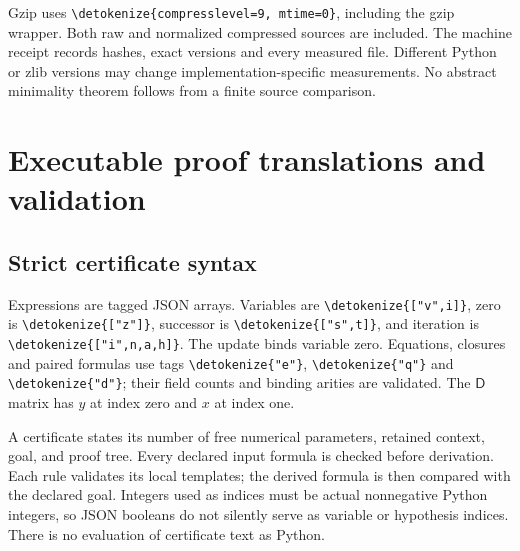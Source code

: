 \documentclass[11pt,letterpaper]{article}
\theoremstyle{definition}\newtheorem{definition}[theorem]{Definition}
\theoremstyle{remark}\newtheorem{remark}[theorem]{Remark}
\newcommand{\D}{\mathsf D}
\newcommand{\file}[1]{\expandafter\nolinkurl\expandafter{\detokenize{#1}}}
\begin{document}
Gzip uses \file{compresslevel=9, mtime=0}, including the gzip wrapper.
Both raw and normalized compressed sources are included. The machine
receipt records hashes, exact versions and every measured file. Different
Python or zlib versions may change implementation-specific measurements.
No abstract minimality theorem follows from a finite source comparison.

\section{Executable proof translations and validation}

\subsection{Strict certificate syntax}

Expressions are tagged JSON arrays. Variables are \file{["v",i]},
zero is \file{["z"]}, successor is \file{["s",t]}, and iteration is
\file{["i",n,a,h]}. The update binds variable zero. Equations,
closures and paired formulas use tags \file{"e"}, \file{"q"} and
\file{"d"}; their field counts and binding arities are validated.
The $\D$ matrix has $y$ at index zero and $x$ at index one.

A certificate states its number of free numerical parameters, retained
context, goal, and proof tree. Every declared input formula is checked
before derivation. Each rule validates its local templates; the derived
formula is then compared with the declared goal. Integers used as
indices must be actual nonnegative Python integers, so JSON booleans do
not silently serve as variable or hypothesis indices. There is no
evaluation of certificate text as Python.
\end{document}

